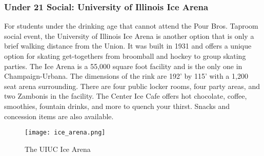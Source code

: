 \subsubsection{Under 21 Social: University of Illinois Ice Arena}
For students under the drinking age that cannot attend the Pour Bros. Taproom social event, the University of Illinois Ice Arena is another option that is only a brief walking distance from the Union. It was built in 1931 and offers a unique option for skating get-togethers from broomball and hockey to group skating parties. The Ice Arena is a 55,000 square foot facility and is the only one in Champaign-Urbana. The dimensions of the rink are 192' by 115' with a 1,200 seat arena surrounding. There are four public locker rooms, four party areas, and two Zambonis in the facility. The Center Ice Cafe offers hot chocolate, coffee, smoothies, fountain drinks, and more to quench your thirst.  Snacks and concession items are also available.
\vspace{0.5cm}\newline
\begin{figure}[H]
	\centering
	\texttt{[image: ice\_arena.png]}
	\caption{The UIUC Ice Arena}
\end{figure}

